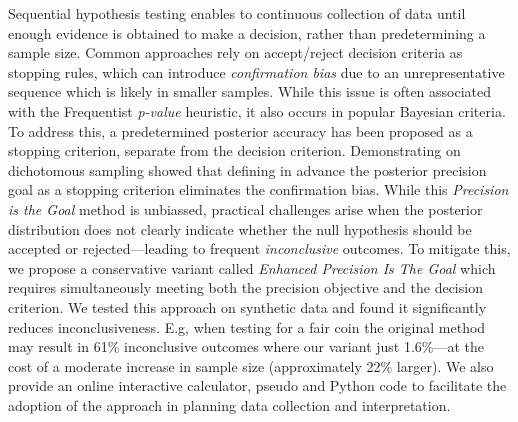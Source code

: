 Sequential hypothesis testing enables to continuous collection of data until enough
evidence is obtained to make a decision, rather than predetermining a sample
size.
Common approaches rely on accept/reject decision criteria as stopping rules,
which can introduce {\it confirmation bias} due to an unrepresentative sequence which is
likely in smaller samples.
While this issue is often associated with the Frequentist {\it p-value} heuristic,
it also occurs in popular Bayesian criteria.
To address this, a predetermined posterior accuracy has been proposed
as a stopping criterion, separate from the decision criterion.
Demonstrating on dichotomous sampling \cite{kruschke2015doing} showed that
defining in advance the
posterior precision goal as a stopping criterion eliminates the confirmation bias.
While this {\it Precision is the Goal} method is unbiassed,
practical challenges arise when the posterior distribution does not clearly indicate
whether the null hypothesis should be accepted or rejected—leading to frequent {\it inconclusive}
outcomes.
To mitigate this, we propose a conservative variant called
{\it Enhanced Precision Is The Goal} which requires simultaneously meeting both the
precision objective and the decision criterion.
We tested this approach on synthetic data and found it significantly reduces
inconclusiveness. E.g, when testing for a fair coin the original method may result in 61\%
inconclusive outcomes where our variant just 1.6\%—at the cost of a moderate increase in sample
size (approximately 22\% larger).
We also provide an online interactive calculator, pseudo and Python code to facilitate the adoption of the
approach in planning data collection and interpretation.


\
\

%



